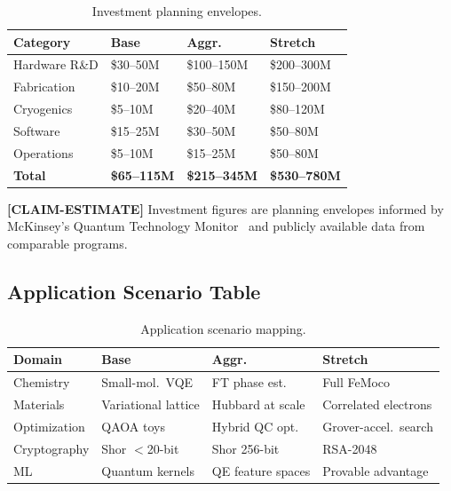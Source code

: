 \documentclass[conference]{IEEEtran}
\begin{document}
\begin{table}[H]
\centering
\caption{Investment planning envelopes.}
\label{tab:investment}
\begin{tabular}{@{}l l l l@{}}
\toprule
\textbf{Category} & \textbf{Base} & \textbf{Aggr.} & \textbf{Stretch} \\
\midrule
Hardware R\&D & \$30--50M & \$100--150M & \$200--300M \\
Fabrication & \$10--20M & \$50--80M & \$150--200M \\
Cryogenics & \$5--10M & \$20--40M & \$80--120M \\
Software & \$15--25M & \$30--50M & \$50--80M \\
Operations & \$5--10M & \$15--25M & \$50--80M \\
\textbf{Total} & \textbf{\$65--115M} & \textbf{\$215--345M} & \textbf{\$530--780M} \\
\bottomrule
\end{tabular}
\end{table}

\textbf{[CLAIM-ESTIMATE]} Investment figures are planning envelopes informed by McKinsey's Quantum Technology Monitor~\cite{mckinsey2024} and publicly available data from comparable programs.

\subsection{Application Scenario Table}

\begin{table}[H]
\centering
\caption{Application scenario mapping.}
\label{tab:app_scenarios}
\begin{tabular}{@{}l L{1.8cm} L{2cm} L{2cm}@{}}
\toprule
\textbf{Domain} & \textbf{Base} & \textbf{Aggr.} & \textbf{Stretch} \\
\midrule
Chemistry & Small-mol.\ VQE & FT phase est. & Full FeMoco~\cite{reiher2017} \\
Materials & Variational lattice & Hubbard at scale & Correlated electrons \\
Optimization & QAOA toys & Hybrid QC opt. & Grover-accel.\ search \\
Cryptography & Shor $<$20-bit & Shor 256-bit & RSA-2048~\cite{gidney2021} \\
ML & Quantum kernels & QE feature spaces & Provable advantage \\
\bottomrule
\end{tabular}
\end{table}
\end{document}
